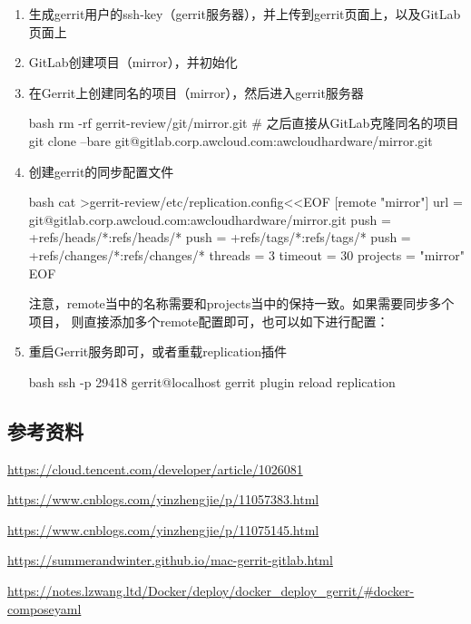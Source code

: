 \begin{enumerate}
  \item 生成gerrit用户的ssh-key（gerrit服务器），并上传到gerrit页面上，以及GitLab页面上
  \item GitLab创建项目（mirror），并初始化
  \item 在Gerrit上创建同名的项目（mirror），然后进入gerrit服务器

  \begin{code-block}{bash}
  rm -rf gerrit-review/git/mirror.git
  # 之后直接从GitLab克隆同名的项目
  git clone --bare git@gitlab.corp.awcloud.com:awcloudhardware/mirror.git
  \end{code-block}

  \item 创建gerrit的同步配置文件

  \begin{code-block}{bash}
  cat >gerrit-review/etc/replication.config<<EOF
  [remote "mirror"]
  url =  git@gitlab.corp.awcloud.com:awcloudhardware/mirror.git
  push = +refs/heads/*:refs/heads/*
  push = +refs/tags/*:refs/tags/*
  push = +refs/changes/*:refs/changes/*
  threads = 3
  timeout = 30
  projects = "mirror"
  EOF
  \end{code-block}

  注意，remote当中的名称需要和projects当中的保持一致。如果需要同步多个项目，
 则直接添加多个remote配置即可，也可以如下进行配置：
  \item 重启Gerrit服务即可，或者重载replication插件

  \begin{code-block}{bash}
  ssh -p 29418 gerrit@localhost gerrit plugin reload replication
  \end{code-block}
\end{enumerate}

\subsection{参考资料}
\url{https://cloud.tencent.com/developer/article/1026081}

\url{https://www.cnblogs.com/yinzhengjie/p/11057383.html}

\url{https://www.cnblogs.com/yinzhengjie/p/11075145.html}

\url{https://summerandwinter.github.io/mac-gerrit-gitlab.html}

\url{https://notes.lzwang.ltd/Docker/deploy/docker_deploy_gerrit/#docker-composeyaml}
